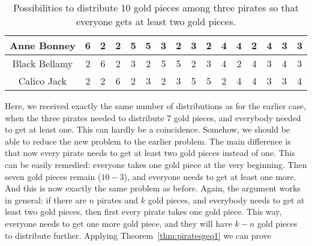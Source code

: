 \begin{table}[!htb]
\caption{Possibilities to distribute 10 gold pieces among three pirates so that everyone gets at least two gold pieces.}\label{tab:10gp3p}
\begin{center}

\begin{tabular}{|c||c|c|c|c|c|c|c|c|c|c|c|c|c|c|c|}
\hline
Anne Bonney & 6 & 2 & 2 & 5 & 5 & 3 & 2 & 3 & 2 & 4 & 4 & 2 & 4 & 3 & 3\\
\hline
Black Bellamy & 2 & 6 & 2 & 3 & 2 & 5 & 5 & 2 & 3 & 4 & 2 & 4 & 3 & 4 & 3\\
\hline
Calico Jack & 2 & 2 & 6 & 2 & 3 & 2 & 3 & 5 & 5 & 2 & 4 & 4 & 3 & 3 & 4\\
\hline
\end{tabular}
\end{center}
\end{table}

Here, we received exactly the same number of distributions as for the earlier case, 
when the three pirates needed to distribute 7 gold pieces, and everybody needed to get at least one. 
This can hardly be a coincidence. 
Somehow, we should be able to reduce the new problem to the earlier problem. 
The main difference is that now every pirate needs to get at least two gold pieces instead of one. 
This can be easily remedied: everyone takes one gold piece at the very beginning. 
Then seven gold pieces remain ($10-3$), 
and everyone needs to get at least one more. 
And this is now exactly the same problem as before. 
Again, the argument works in general: 
if there are $n$ pirates and $k$ gold pieces, 
and everybody needs to get at least two gold pieces, 
then first every pirate takes one gold piece. 
This way, everyone needs to get one more gold piece, 
and they will have $k-n$ gold pieces to distribute further. 
Applying Theorem~\ref{thm:piratesgeq1} we can prove
 

